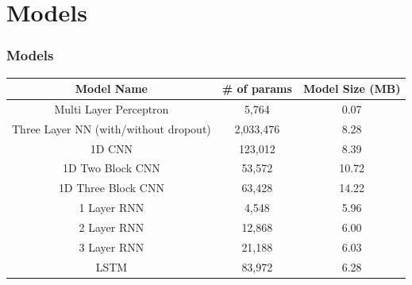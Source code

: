 \documentclass[pdf, 9pt]{beamer}
\begin{document}
	\section{Models}
	\begin{frame}
		\frametitle{Models}
		\begin{table}[]
			\centering
			\begin{tabular}{|c|c|c|}
				\hline
				\textbf{Model Name}                   & \textbf{\# of params} & \textbf{Model Size (MB)} \\ \hline
				Multi Layer Perceptron                & 5,764                 & 0.07                     \\
				Three Layer NN (with/without dropout) & 2,033,476             & 8.28                     \\
				1D CNN                                & 123,012               & 8.39                     \\
				1D Two Block CNN                      & 53,572                & 10.72                    \\
				1D Three Block CNN                    & 63,428                & 14.22                    \\
				1 Layer RNN                           & 4,548                 & 5.96                     \\
				2 Layer RNN                           & 12,868                & 6.00                     \\
				3 Layer RNN                           & 21,188                & 6.03                     \\
				LSTM                                  & 83,972                & 6.28                     \\ \hline
			\end{tabular}
			\label{model_details}
		\end{table}
	\end{frame}
	
\end{document}

